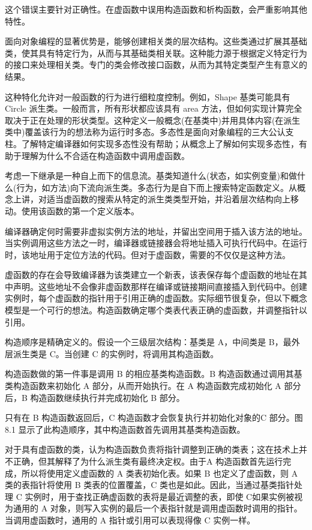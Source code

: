 这个错误主要针对正确性。在虚函数中误用构造函数和析构函数，会严重影响其他特性。

面向对象编程的显著优势是，能够创建相关类的层次结构。这些类通过扩展其基础类，使其具有特定行为，从而与其基础类相关联。这种能力源于根据定义特定行为的接口来处理相关类。专门的类会修改接口函数，从而为其特定类型产生有意义的结果。

这种特化允许对一般函数的行为进行细粒度控制。例如，Shape 基类可能具有 Circle 派生类。一般而言，所有形状都应该具有 area 方法，但如何实现计算完全取决于正在处理的形状类型。这种定义一般概念(在基类中)并用具体内容(在派生类中)覆盖该行为的想法称为运行时多态。多态性是面向对象编程的三大公认支柱。了解特定编译器如何实现多态性没有帮助；从概念上了解如何实现多态性，有助于理解为什么不合适在构造函数中调用虚函数。

考虑一下继承是一种自上而下的信息流。基类知道什么(状态，如实例变量)和做什么(行为，如方法)向下流向派生类。多态行为是自下而上搜索特定函数定义。从概念上讲，对适当虚函数的搜索从特定的派生类类型开始，并沿着层次结构向上移动。使用该函数的第一个定义版本。

编译器确定何时需要非虚拟实例方法的地址，并留出空间用于插入该方法的地址。当实例调用这些方法之一时，编译器或链接器会将地址插入可执行代码中。在运行时，该地址用于定位方法的代码。但对于虚函数，需要的不仅仅是这种方法。

虚函数的存在会导致编译器为该类建立一个新表，该表保存每个虚函数的地址在其中声明。这些地址不会像非虚函数那样在编译或链接期间直接插入到代码中。创建实例时，每个虚函数的指针用于引用正确的虚函数。实际细节很复杂，但以下概念模型是一个可行的想法。构造函数确定哪个类表代表正确的虚函数，并调整指针以引用。

构造顺序是精确定义的。假设一个三级层次结构：基类是 A，中间类是 B，最外层派生类是 C。当创建 C 的实例时，将调用其构造函数。

构造函数做的第一件事是调用 B 的相应基类构造函数。B 构造函数通过调用其基类构造函数来初始化 A 部分，从而开始执行。在 A 构造函数完成初始化 A 部分后，B 构造函数继续执行并完成初始化 B 部分。


只有在 B 构造函数返回后，C 构造函数才会恢复执行并初始化对象的C 部分。图 8.1 显示了此构造顺序，其中构造函数首先调用其基类构造函数。

对于具有虚函数的类，认为构造函数负责将指针调整到正确的类表；这在技术上并不正确，但其解释了为什么派生类有最终决定权。由于A 构造函数首先运行完成，所以将使用定义虚函数的 A 类表初始化表。如果 B 也定义了虚函数，则 A 类的表指针将使用 B 类表的位置覆盖，C 类也是如此。因此，当通过基类指针处理 C 实例时，用于查找正确虚函数的表将是最近调整的表，即使 C如果实例被视为通用的 A 对象，则写入实例的最后一个表指针就是调用虚函数时调用的指针。当调用虚函数时，通用的 A 指针或引用可以表现得像 C 实例一样。

